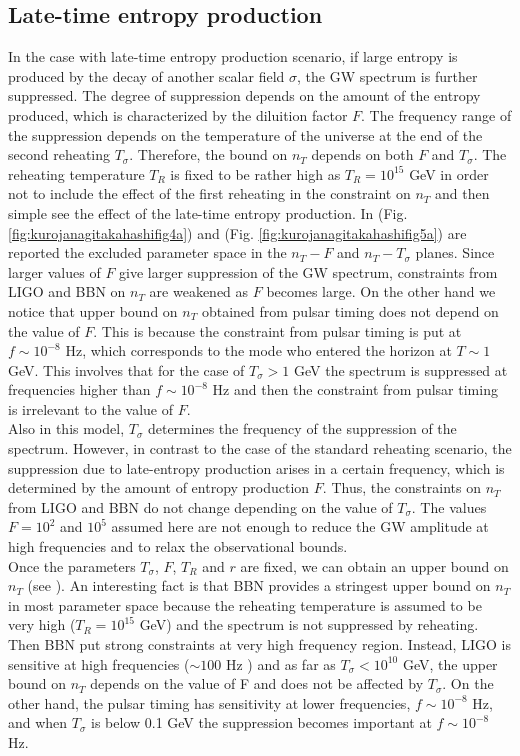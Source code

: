 \documentclass[11pt,a4paper,twoside]{book}
\begin{document}
\subsection*{Late-time entropy production}
In the case with late-time entropy production scenario, if large entropy is produced by the decay of another scalar field $\sigma$, the GW spectrum is further suppressed. The degree of suppression depends on the amount of the entropy produced, which is characterized by the diluition factor $ F $. The frequency range of the suppression depends on the temperature of the universe at the end of the second reheating $ T_{\sigma} $. Therefore, the bound on $ n_{T} $ depends on both $ F $ and $ T_{\sigma} $. The reheating temperature $ T_{R} $ is fixed  to be rather high as $ T_{R}=10^{15} $ GeV in order not to include the effect of the first reheating in the constraint on $ n_{T} $ and then simple see the effect of the late-time entropy production. In (Fig. \ref{fig:kurojanagitakahashifig4a}) and (Fig. \ref{fig:kurojanagitakahashifig5a}) are reported the excluded parameter space in the $ n_{T}-F $
 and $ n_{T}-T_{\sigma} $ planes. Since larger values of $ F $ give larger suppression of the GW spectrum, constraints from LIGO and BBN on $ n_{T} $ are weakened as $ F $ becomes large. On the other hand we notice that upper bound on $ n_{T} $ obtained from pulsar timing does not depend on the value of $ F $. This is because the constraint from pulsar timing is put at $ f \sim 10^{-8} $ Hz, which corresponds to the mode who entered the horizon at $ T \sim 1 $ GeV. This involves that for the case of $ T_{\sigma} > 1 $ GeV the spectrum is suppressed at frequencies higher than $ f \sim 10^{-8} $ Hz and then the constraint from pulsar timing is irrelevant to the value of $ F $.\\
Also in this model, $ T_{\sigma} $ determines the frequency of the suppression of the spectrum. However, in contrast to the case of the standard reheating scenario, the suppression due to late-entropy production arises in a certain frequency, which is determined by the amount of entropy production $ F $. Thus, the constraints on $ n_{T} $ from LIGO and BBN do not change depending on the value of $ T_{\sigma} $. The values $ F=10^{2} $ and $ 10^{5} $ assumed here are not enough to reduce the GW amplitude at high frequencies and to relax the observational bounds.\\
 Once the parameters $ T_{\sigma} $, $ F $, $ T_{R} $ and $ r $ are fixed, we can obtain an upper bound on $ n_{T} $ (see \cite{Chap3:BlueTiltedSpectrum}). An interesting fact is that BBN provides a stringest upper bound on $ n_{T} $ in most parameter space because the reheating temperature is assumed to be very high ($ T_{R}=10^{15} $ GeV) and the spectrum is not suppressed by reheating. Then BBN put strong constraints at very high frequency region. Instead, LIGO is sensitive at high frequencies ($\sim 100$ Hz ) and as far as $ T_{\sigma} < 10^{10} $ GeV, the upper bound on $ n_{T} $ depends on the value of F and does not be affected by $ T_{\sigma} $. On the other hand, the pulsar timing has sensitivity at lower frequencies, $ f\sim 10^{-8} $ Hz, and when $ T_{\sigma} $ is below 0.1 GeV the suppression  becomes important at $ f\sim 10^{-8} $ Hz. 
\end{document}
